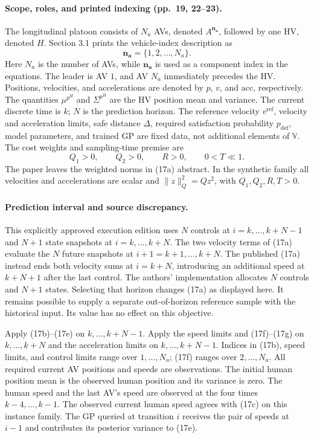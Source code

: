 \documentclass{article}
\begin{document}
\paragraph{Scope, roles, and printed indexing (pp.\ 19, 22--23).}
The longitudinal platoon consists of $N_a$ AVs, denoted $A^{\mathbf{n_a}}$, followed by one HV, denoted $H$. Section 3.1 prints the vehicle-index description as
\[
\mathbf{n_a}=\{1,2,\ldots,N_a\}.
\]
Here $N_a$ is the number of AVs, while $\mathbf{n_a}$ is used as a component index in the equations. The leader is AV $1$, and AV $N_a$ immediately precedes the HV. Positions, velocities, and accelerations are denoted by $p$, $v$, and $\mathrm{acc}$, respectively. The quantities $\mu^{p^H}$ and $\Sigma^{p^H}$ are the HV position mean and variance. The current discrete time is $k$; $N$ is the prediction horizon. The reference velocity $v^{\mathrm{ref}}$, velocity and acceleration limits, safe distance $\Delta$, required satisfaction probability $p_{\mathrm{def}}$, model parameters, and trained GP are fixed data, not additional elements of $\mathbb V$. The cost weights and sampling-time premise are
\[
Q_1>0,\qquad Q_2>0,\qquad R>0,\qquad 0<T\ll1.
\]
The paper leaves the weighted norms in (17a) abstract. In the synthetic family all velocities and accelerations are scalar and $\|z\|^2_Q=Qz^2$, with $Q_1,Q_2,R,T>0$.

\paragraph{Prediction interval and source discrepancy.}
This explicitly approved execution edition uses $N$ controls at $i=k,\dots,k+N-1$ and $N+1$ state snapshots at $i=k,\dots,k+N$. The two velocity terms of (17a) evaluate the $N$ future snapshots at $i+1=k+1,\dots,k+N$. The published (17a) instead ends both velocity sums at $i=k+N$, introducing an additional speed at $k+N+1$ after the last control. The authors' implementation allocates $N$ controls and $N+1$ states. Selecting that horizon changes (17a) as displayed here. It remains possible to supply a separate out-of-horizon reference sample with the historical input. Its value has no effect on this objective.

Apply (17b)--(17e) on $k,\dots,k+N-1$. Apply the speed limits and (17f)--(17g) on $k,\dots,k+N$ and the acceleration limits on $k,\dots,k+N-1$. Indices in (17b), speed limits, and control limits range over $1,\dots,N_a$; (17f) ranges over $2,\dots,N_a$. All required current AV positions and speeds are observations. The initial human position mean is the observed human position and its variance is zero. The human speed and the last AV's speed are observed at the four times $k-4,\dots,k-1$. The observed current human speed agrees with (17c) on this instance family. The GP queried at transition $i$ receives the pair of speeds at $i-1$ and contributes its posterior variance to (17e).
\end{document}

